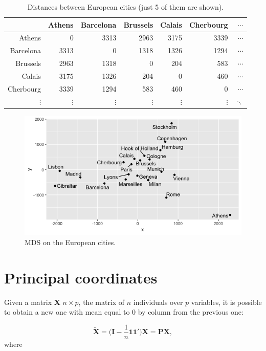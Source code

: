 \documentclass[11pt]{report}
\begin{document}
\begin{table}[ht]
\centering
\begin{tabular}{rrrrrrr}
 & Athens & Barcelona & Brussels & Calais & Cherbourg & $\dotsi$ \\ 
  \hline
Athens & 0 & 3313 & 2963 & 3175 & 3339 & $\dotsi$ \\ 
  Barcelona & 3313 & 0& 1318 & 1326 & 1294 & $\dotsi$ \\ 
  Brussels & 2963 & 1318 & 0 & 204 & 583 & $\dotsi$ \\ 
  Calais & 3175 & 1326 & 204 & 0 & 460 & $\dotsi$ \\ 
  Cherbourg & 3339 & 1294 & 583 & 460 & 0 & $\dotsi$ \\
  $\vdots$ & $\vdots$ & $\vdots$ & $\vdots$ & $\vdots$ & $\vdots$ & $\ddots$ \\
   \hline
\end{tabular}
\caption{Distances between European cities (just 5 of them are shown).} 
\label{european_distances}
\end{table}


\begin{figure}[!ht]
\centering
    \includegraphics[scale = 0.5]{./images/europ_cities.png}
    \caption{MDS on the European cities.}
    \label{europ_cities}
\end{figure}


\section{Principal coordinates}
Given a matrix \textbf{X} $n \times p$, the matrix of $n$ 
individuals over $p$ variables, it is possible to obtain a new one with 
mean equal to 0 by column from the previous one:

\[
\mathbf{\widetilde{X}} = \Big( \mathbf{I} - \frac{1}{n} \mathbf{1}\mathbf{1'}\Big) \mathbf{X} = \mathbf{P}\mathbf{X},
\]
where 
\end{document}
